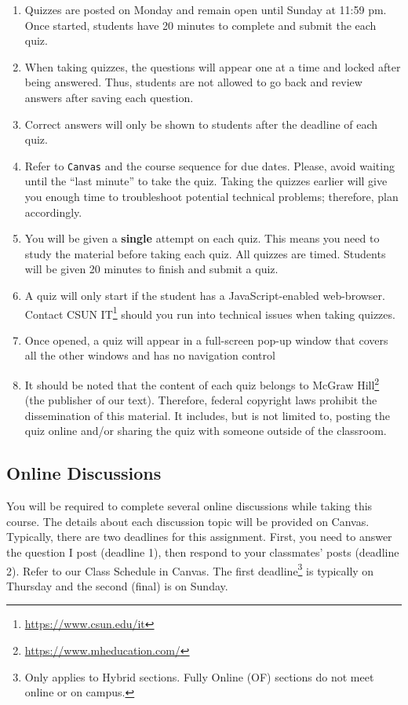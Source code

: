 \documentclass[
  letterpaper,
  DIV=11,
  numbers=noendperiod]{scrartcl}
\DeclareRobustCommand{\href}[2]{#2\footnote{\url{#1}}}
\begin{document}
\begin{enumerate}
\def\labelenumi{\arabic{enumi}.}
\item
  Quizzes are posted on Monday and remain open until Sunday at 11:59 pm.
  Once started, students have 20 minutes to complete and submit the each
  quiz.
\item
  When taking quizzes, the questions will appear one at a time and
  locked after being answered. Thus, students are not allowed to go back
  and review answers after saving each question.
\item
  Correct answers will only be shown to students after the deadline of
  each quiz.
\item
  Refer to \texttt{Canvas} and the course sequence for due dates.
  Please, avoid waiting until the ``last minute'' to take the quiz.
  Taking the quizzes earlier will give you enough time to troubleshoot
  potential technical problems; therefore, plan accordingly.
\item
  You will be given a \textbf{single} attempt on each quiz. This means
  you need to study the material before taking each quiz. All quizzes
  are timed. Students will be given 20 minutes to finish and submit a
  quiz.
\item
  A quiz will only start if the student has a JavaScript-enabled
  web-browser. Contact \href{https://www.csun.edu/it}{CSUN IT} should
  you run into technical issues when taking quizzes.
\item
  Once opened, a quiz will appear in a full-screen pop-up window that
  covers all the other windows and has no navigation control
\item
  It should be noted that the content of each quiz belongs to
  \href{https://www.mheducation.com/}{McGraw Hill} (the publisher of our
  text). Therefore, federal copyright laws prohibit the dissemination of
  this material. It includes, but is not limited to, posting the quiz
  online and/or sharing the quiz with someone outside of the classroom.
\end{enumerate}

\hypertarget{online-discussions}{%
\subsection{Online Discussions}\label{online-discussions}}

You will be required to complete several online discussions while taking
this course. The details about each discussion topic will be provided on
Canvas. Typically, there are two deadlines for this assignment. First,
you need to answer the question I post (deadline 1), then respond to
your classmates' posts (deadline 2). Refer to our Class Schedule in
Canvas. The first deadline\footnote{Only applies to Hybrid sections.
  Fully Online (OF) sections do not meet online or on campus.} is
typically on Thursday and the second (final) is on Sunday.
\end{document}
